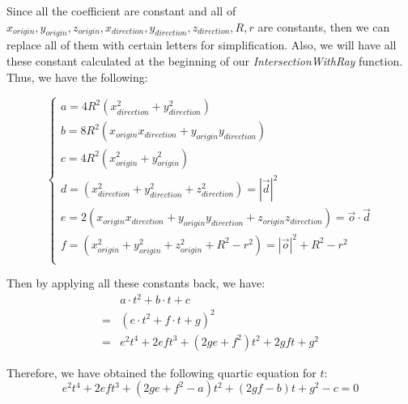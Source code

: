 \documentclass[a4paper,12pt]{report}
\begin{document}
Since all the coefficient are constant and all of $x_{origin},y_{origin},z_{origin},x_{direction},y_{direction},z_{direction},R,r$ are constants, then we can replace all of them with certain letters for simplification. Also, we will have all these constant calculated at the beginning of our \textit{IntersectionWithRay} function. Thus, we have the following:

\[\begin{cases}
a=4R^2(x_{direction}^2+y_{direction}^2)\\
b=8R^2(x_{origin}x_{direction}+y_{origin}y_{direction})\\
c=4R^2(x_{origin}^2+y_{origin}^2)\\
d=(x_{direction}^2+y_{direction}^2+z_{direction}^2)=|\overrightarrow{d}|^2\\
e=2(x_{origin}x_{direction}+y_{origin}y_{direction}+z_{origin}z_{direction})=\overrightarrow{o}\cdot{\overrightarrow{d}}\\
f=(x_{origin}^2+y_{origin}^2+z_{origin}^2+R^2-r^2)=|\overrightarrow{o}|^2+R^2-r^2\\
\end{cases}\]

Then by applying all these constants back, we have: 
\begin{align*}
&a\cdot{t^2}+b\cdot{t}+c\\
=&(e\cdot{t^2}+f\cdot{t}+g)^2\\
=&e^2t^4+2eft^3+(2ge+f^2)t^2+2gft+g^2
\end{align*}

Therefore, we have obtained the following quartic equation for $t$:
\[e^2t^4+2eft^3+(2ge+f^2-a)t^2+(2gf-b)t+g^2-c=0\]
\end{document}
